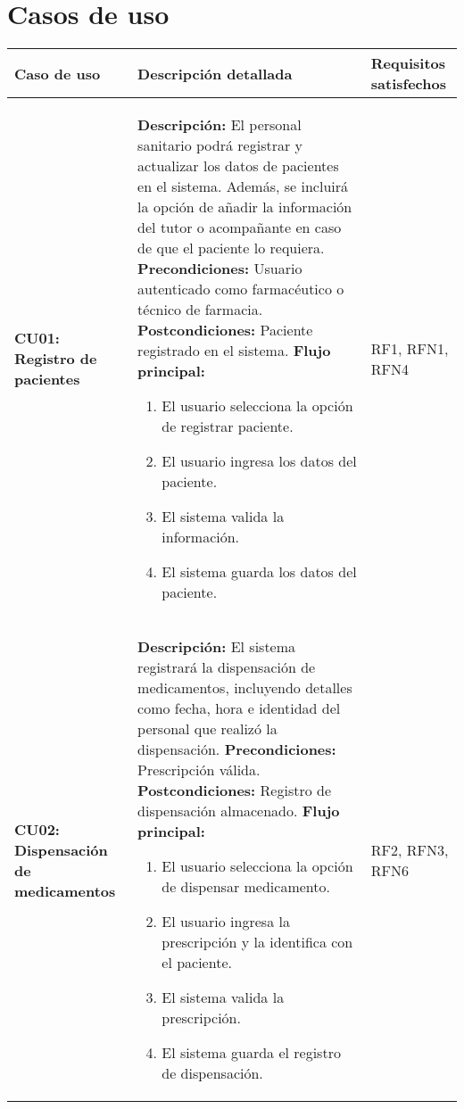 \section{Casos de uso}


\begin{longtable}{|p{3cm}|p{9cm}|p{2cm}|}
	\hline
	\textbf{Caso de uso} & \textbf{Descripción detallada} & \textbf{Requisitos satisfechos} \\
	\hline
	\textbf{CU01: Registro de pacientes} & 
	\textbf{Descripción:} El personal sanitario podrá registrar y actualizar los datos de pacientes en el sistema. Además, se incluirá la opción de añadir la información del tutor o acompañante en caso de que el paciente lo requiera.
	\newline \textbf{Precondiciones:} Usuario autenticado como farmacéutico o técnico de farmacia.
	\newline \textbf{Postcondiciones:} Paciente registrado en el sistema.
	\newline \textbf{Flujo principal:}
	\begin{enumerate}
		\item El usuario selecciona la opción de registrar paciente.
		\item El usuario ingresa los datos del paciente.
		\item El sistema valida la información.
		\item El sistema guarda los datos del paciente.
	\end{enumerate}
	& RF1, RFN1, RFN4 \\
	\hline
	
	\textbf{CU02: Dispensación de medicamentos} & 
	\textbf{Descripción:} El sistema registrará la dispensación de medicamentos, incluyendo detalles como fecha, hora e identidad del personal que realizó la dispensación.
	\newline \textbf{Precondiciones:} Prescripción válida.
	\newline \textbf{Postcondiciones:} Registro de dispensación almacenado.
	\newline \textbf{Flujo principal:}
	\begin{enumerate}
		\item El usuario selecciona la opción de dispensar medicamento.
		\item El usuario ingresa la prescripción y la identifica con el paciente.
		\item El sistema valida la prescripción.
		\item El sistema guarda el registro de dispensación.
	\end{enumerate}
	& RF2, RFN3, RFN6 \\
	\hline
	

\end{longtable}
